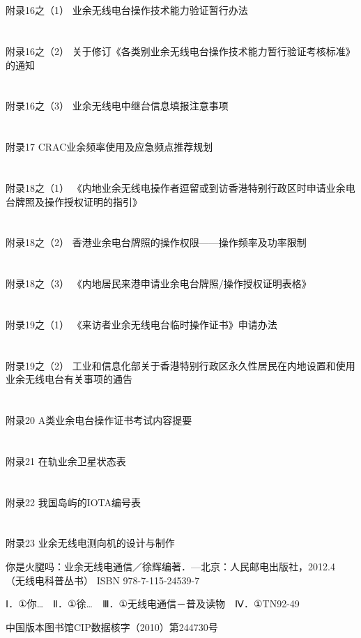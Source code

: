 \documentclass[12pt,UTF8]{ctexbook}
\begin{document}
\section{}附录16之（1） 业余无线电台操作技术能力验证暂行办法
\section{}附录16之（2） 关于修订《各类别业余无线电台操作技术能力暂行验证考核标准》的通知
\section{}附录16之（3） 业余无线电中继台信息填报注意事项
\section{}附录17 CRAC业余频率使用及应急频点推荐规划
\section{}附录18之（1） 《内地业余无线电操作者逗留或到访香港特别行政区时申请业余电台牌照及操作授权证明的指引》
\section{}附录18之（2） 香港业余电台牌照的操作权限——操作频率及功率限制
\section{}附录18之（3） 《内地居民来港申请业余电台牌照/操作授权证明表格》
\section{}附录19之（1） 《来访者业余无线电台临时操作证书》申请办法
\section{}附录19之（2） 工业和信息化部关于香港特别行政区永久性居民在内地设置和使用业余无线电台有关事项的通告
\section{}附录20 A类业余电台操作证书考试内容提要
\section{}附录21 在轨业余卫星状态表
\section{}附录22 我国岛屿的IOTA编号表
\section{}附录23 业余无线电测向机的设计与制作


你是火腿吗：业余无线电通信／徐辉编著．—北京：人民邮电出版社，2012.4
（无线电科普丛书）
ISBN 978-7-115-24539-7

Ⅰ．①你…　Ⅱ．①徐…　Ⅲ．①无线电通信－普及读物　Ⅳ．①TN92-49

中国版本图书馆CIP数据核字（2010）第244730号
\end{document}
